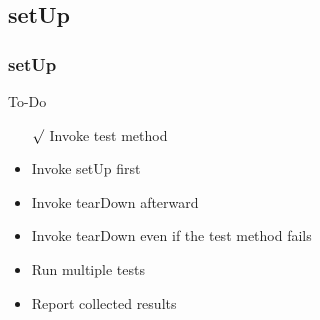 \documentclass[lualatex]{beamer}
\begin{document}
\subsection{setUp}

\begin{frame}
    \frametitle{setUp}

    \begin{block}{To-Do}
        \begin{itemize}
            \item[$\surd$] Invoke test method
            \item Invoke setUp first 
            \item Invoke tearDown afterward 
            \item Invoke tearDown even if the test method fails 
            \item Run multiple tests 
            \item Report collected results 
        \end{itemize}
    \end{block}
\end{frame}
\end{document}
